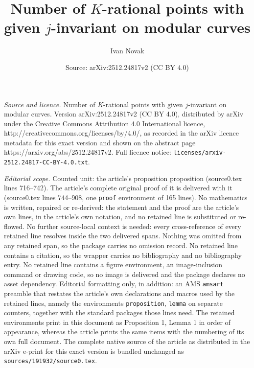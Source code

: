 \documentclass[10pt,a4paper]{amsart}
\title{Number of $K$-rational points with given $j$-invariant on modular curves}
\author{Ivan Novak}
\date{Source: arXiv:2512.24817v2 (CC BY 4.0)}
\begin{document}
\maketitle

\noindent\emph{Source and licence.} Number of $K$-rational points with given $j$-invariant on modular curves. Version arXiv:2512.24817v2 (CC BY 4.0), distributed by arXiv under the Creative Commons Attribution 4.0 International licence, http://creativecommons.org/licenses/by/4.0/, as recorded in the arXiv licence metadata for this exact version and shown on the abstract page https://arxiv.org/abs/2512.24817v2. Full licence notice: \texttt{licenses/arxiv-2512.24817-CC-BY-4.0.txt}.\par\smallskip

\noindent\textit{Editorial scope.} Counted unit: the article's proposition proposition (source0.tex lines 716--742). The article's complete original proof of it is delivered with it (source0.tex lines 744--908, one \texttt{proof} environment of 165 lines). No mathematics is written, repaired or re-derived: the statement and the proof are the article's own lines, in the article's own notation, and no retained line is substituted or re-flowed.  No further source-local context is needed: every cross-reference of every retained line resolves inside the two delivered spans.  Nothing was omitted from any retained span, so the package carries no omission record.  No retained line contains a citation, so the wrapper carries no bibliography and no bibliography entry.  No retained line contains a figure environment, an image-inclusion command or drawing code, so no image is delivered and the package declares no asset dependency.  Editorial formatting only, in addition: an AMS \texttt{amsart} preamble that restates the article's own declarations and macros used by the retained lines, namely the environments \texttt{proposition}, \texttt{lemma} on separate counters, together with the standard packages those lines need.  The retained environments print in this document as Proposition 1, Lemma 1 in order of appearance, whereas the article prints the same items with the numbering of its own full document.  The complete native source of the article as distributed in the arXiv e-print for this exact version is bundled unchanged as \texttt{sources/191932/source0.tex}.
\end{document}
